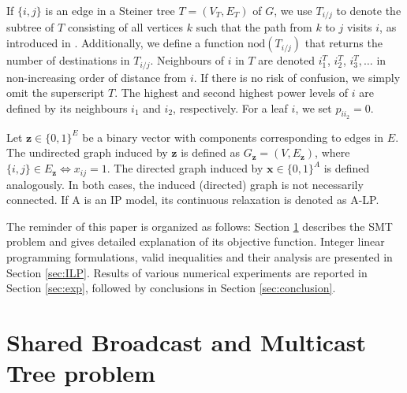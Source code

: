 If $\{i,j\}$ is an edge in a Steiner tree $T=(V_T,E_T)$ of $G$, we use $T_{i/j}$ to denote the subtree of $T$ consisting of all vertices $k$ such that the path from $k$ to $j$ visits $i$, as introduced in \cite{Haugland12Dual}. Additionally, we define a function $\text{nod}(T_{i/j})$ that returns the number of destinations in $T_{i/j}$. Neighbours of $i$ in $T$ are denoted $i^T_1$, $i^T_2$, $i^T_3, \dots$ in non-increasing order of distance from $i$. If there is no risk of confusion, we simply omit the superscript $T$. The highest and second highest power levels of $i$ are defined by its neighbours $i_1$ and $i_2$, respectively. For a leaf $i$, we set $p_{ii_2}=0$.

Let $\mathbf{z} \in \{0,1\}^E$ be a binary vector with components corresponding to edges in $E$. The undirected graph induced by $\mathbf{z}$ is defined as  $G_\mathbf{z}=(V,E_\mathbf{z})$, where $\{i,j\}\in E_\mathbf{z}\Leftrightarrow x_{ij}=1$. The directed graph induced by $\mathbf{x} \in \{0,1\}^A$ is defined analogously. In both cases, the induced (directed) graph is not necessarily connected. If A is an IP model, its continuous relaxation is denoted as A-LP.

The reminder of this paper is organized as follows: Section \ref{sec:SBT} describes the SMT problem and gives detailed explanation of its objective function. Integer linear programming formulations, valid inequalities and their analysis are presented in Section \ref{sec:ILP}. Results of various numerical experiments are reported in Section \ref{sec:exp}, followed by conclusions in Section \ref{sec:conclusion}.
\section{Shared Broadcast and Multicast Tree problem}
\label{sec:SBT}

